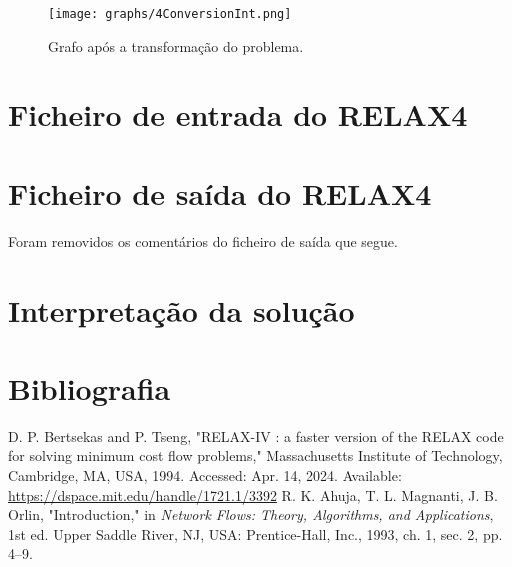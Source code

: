\documentclass[12pt, a4paper, titlepage]{article}
\begin{document}
\begin{figure}[H]
    \centering
    \texttt{[image: graphs/4ConversionInt.png]}
    \caption{Grafo após a transformação do problema.}
    \label{4conversion-graph}
\end{figure}

\section{Ficheiro de entrada do RELAX4}


\section{Ficheiro de saída do RELAX4}
Foram removidos os comentários do ficheiro de saída que segue.


\section{Interpretação da solução}


\section{Bibliografia}
\def\refname{}
\vspace{-1.5cm}
\begin{thebibliography}{9}
        D. P. Bertsekas and P. Tseng, "RELAX-IV : a faster version of the RELAX code for solving
        minimum cost flow problems,"{} Massachusetts Institute of Technology, Cambridge, MA, USA,
        1994. Accessed: Apr. 14, 2024. Available: \url{https://dspace.mit.edu/handle/1721.1/3392}
        R. K. Ahuja, T. L. Magnanti, J. B. Orlin, "Introduction,"{} in \emph{Network Flows: Theory,
        Algorithms, and Applications}, 1st ed. Upper Saddle River, NJ, USA: Prentice-Hall, Inc.,
        1993, ch. 1, sec. 2, pp. 4--9.
\end{thebibliography}
\end{document}
